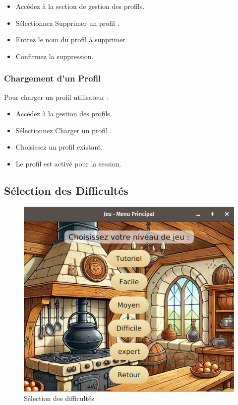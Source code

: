 \begin{itemize}
  \item Accédez à la section de gestion des profils.
  \item Sélectionnez \og Supprimer un profil \fg.
  \item Entrez le nom du profil à supprimer.
  \item Confirmez la suppression.
\end{itemize}

\subsubsection{Chargement d'un Profil}

Pour charger un profil utilisateur :

\begin{itemize}
  \item Accédez à la gestion des profils.
  \item Sélectionnez \og Charger un profil \fg.
  \item Choisissez un profil existant.
  \item Le profil est activé pour la session.
\end{itemize}

\subsection{Sélection des Difficultés}

\begin{figure}[h]
    \centering
    \includegraphics[width=15cm]{../Annexe/Screen/difficulte.png}
    \caption{Sélection des difficultés}
\end{figure}

